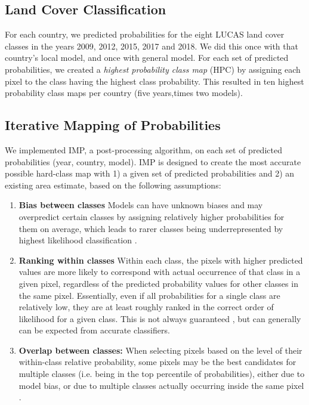     \subsection{Land Cover Classification}
        For each country, we predicted probabilities for the eight LUCAS land cover classes in the years 2009, 2012, 2015, 2017 and 2018. We did this once with that country's local model, and once with general model. For each set of predicted probabilities, we created a \textit{highest probability class map} (HPC) by assigning each pixel to the class having the highest class probability. This resulted in ten highest probability class maps per country (five years,times two models).


    \subsection{Iterative Mapping of Probabilities}
    We implemented IMP, a post-processing algorithm, on each set of predicted probabilities (year, country, model). IMP is designed to create the most accurate possible hard-class map with 1) a given set of predicted probabilities and 2) an existing area estimate, based on the following assumptions: 
    \begin{enumerate}
        \item \textbf{Bias between classes} Models can have unknown biases and may overpredict certain classes by assigning relatively higher probabilities for them on average, which leads to rarer classes being underrepresented by highest likelihood classification \citep{he2009learning,waldner2017where}.
        \item \textbf{Ranking within classes} Within each class, the pixels with higher predicted values are more likely to correspond with actual occurrence of that class in a given pixel, regardless of the predicted probability values for other classes in the same pixel. Essentially, even if all probabilities for a single class are relatively low, they are at least roughly ranked in the correct order of likelihood for a given class. This is not always guaranteed \citep{niculescu2005predicting}, but can generally can be expected from accurate classifiers.
        \item \textbf{Overlap between classes:} When selecting pixels based on the level of their within-class relative probability, some pixels may be the best candidates for multiple classes (i.e. being in the top percentile of probabilities), either due to model bias, or due to multiple classes actually occurring inside the same pixel \citep{horvath2021comparison}.
    \end{enumerate}

